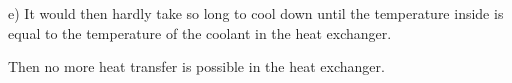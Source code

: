 e) It would then hardly take so long to cool down until the temperature inside is equal to the temperature of the coolant in the heat exchanger.

Then no more heat transfer is possible in the heat exchanger.